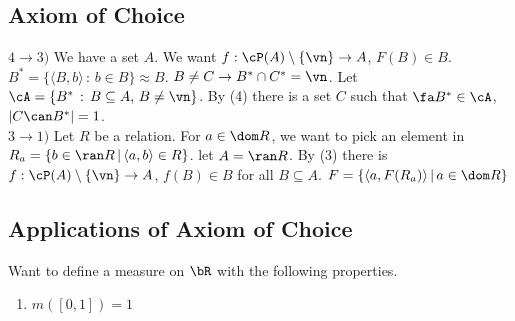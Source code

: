 
\subsection{Axiom of Choice}

\begin{pf}[Pf (cont)]
    $4 \to 3)$ We have a set $A$. We want $f: \cP(A) \setminus \{\vn\} \to A$, $F(B) \in B$. $B^* = \{ \langle B, b \rangle \, : \, b \in B \} \approx B$. $B \neq C \to B^* \cap C^* = \vn$. Let $\cA = \{B^* \, : \, B \subseteq A, \, B \neq \vn\}$. By (4) there is a set $C$ such that $\fa B^* \in \cA$, $|C \can B^*| = 1$. \\
    $3 \to 1)$ Let $R$ be a relation. For $a \in \dom R$, we want to pick an element in $R_a = \{b \in \ran R \, | \, \langle a, b \rangle \in R \}$. let $A = \ran R$. By (3) there is $f: \cP(A) \setminus \{ \vn\} \to A$, $f(B) \in B$ for all $B \subseteq A$. $F = \{ \langle a , F(R_a) \rangle \, | \, a \in \dom R\}$ 
\end{pf}

\subsection{Applications of Axiom of Choice}

Want to define a measure on $\bR$ with the following properties. 
\begin{enumerate}
    \item $m([0,1])=1$
\end{enumerate}